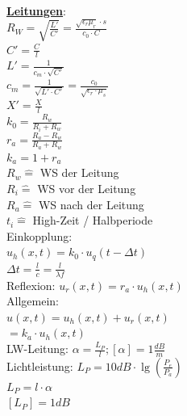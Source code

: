 \documentclass[8pt]{extarticle}
\begin{document}
\begin{minipage}{0.33\textwidth}
\underline{\textbf{Leitungen}}:\\
$R_W = \sqrt{\frac{L'}{C'}} = \frac{\sqrt{\epsilon_r \mu_r} \cdot s}{c_0 \cdot C}$ \\
$C' = \frac{C}{l}$\\
$L' = \frac{1}{c_m \cdot \sqrt{C'}}$\\
$c_m= \frac{1}{\sqrt{L' \cdot C'}} = \frac{c_0}{\sqrt{\epsilon_r \cdot \mu_s}}$\\
$X' = \frac{X}{l}$\\

$k_0 = \frac{R_w}{R_i + R_w} $\\
$r_a = \frac{R_a - R_w}{R_a + R_w} $\\
$k_a = 1 + r_a$\\
$R_w \hat{=}$ WS der Leitung\\
$R_i \hat{=}$ WS vor der Leitung\\
$R_a \hat{=}$ WS nach der Leitung\\
$t_i \hat{=}$ High-Zeit / Halbperiode\\
Einkopplung:\\
\phantom{ss} $u_h(x,t)= k_0 \cdot u_{q}(t-\Delta t)$\\
\phantom{sss}$\Delta t = \frac{l}{c} = \frac{l}{\lambda f}$\\
Reflexion: $u_r(x,t) = r_a \cdot u_h(x,t)$\\
Allgemein:\\
\phantom{ss} $u(x,t) = u_h(x,t) + u_r(x,t)$\\
\phantom{sssssssiss} $= k_a \cdot u_h(x,t)$\\

LW-Leitung: $\alpha = \frac{L_P}{l}; [\alpha] = 1 \frac{dB}{m}$\\
Lichtleistung: $L_P = 10dB \cdot \lg (\frac{P_e}{P_a})$\\
\phantom{sssssississsssss} $L_P = l \cdot \alpha$\\
\phantom{sssssississsssss}$ [L_P] = 1dB$\\



\end{minipage}%
~~~~~~
\end{document}
